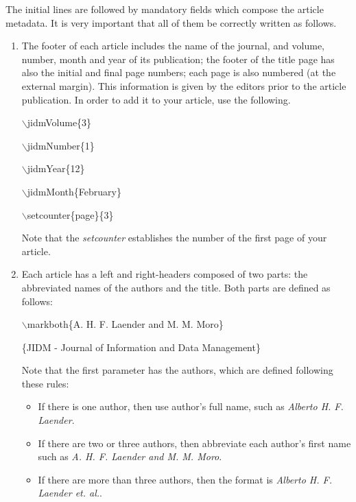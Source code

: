 \documentclass[jidm,a4paper]{jidm} %
\newenvironment{latexcode}
{\ttfamily\vspace{0.1in}\setlength{\parindent}{18pt}}
{\vspace{0.1in}}
\begin{document}

The initial lines are followed by mandatory fields which compose the article metadata. It is very important that all of them be correctly written as follows.

\begin{enumerate}
	\item The footer of each article includes the name of the journal, and volume, number, month and year of its publication; the footer of the title page has also the initial and final page numbers; each page is also numbered (at the external margin). This information is given by the editors prior to the article publication. In order to add it to your article, use the following.
	
		\begin{latexcode} 
			$\backslash$jidmVolume\{3\}
			
			$\backslash$jidmNumber\{1\}
			
			$\backslash$jidmYear\{12\}
			
			$\backslash$jidmMonth\{February\}
			
			$\backslash$setcounter\{page\}\{3\}
		\end{latexcode}

	Note that the \textit{setcounter} establishes the number of the first page of your article.

	\item Each article has a left and right-headers composed of two parts: the abbreviated names of the authors and the title. Both parts are defined as follows:
	
		\begin{latexcode} 
			$\backslash$markboth\{A. H. F. Laender and M. M. Moro\}
			
				\{JIDM - Journal of Information and Data Management\} 
		\end{latexcode}
	
		Note that the first parameter has the authors, which are defined following these rules:
		
\begin{itemize}
	\item If there is one author, then use author's full name, such as \textit{Alberto H. F. Laender}.
	\item If there are two or three authors, then abbreviate each author's first name such as \textit{A. H. F. Laender and M. M. Moro}.
	\item If there are more than three authors, then the format is \textit{Alberto H. F. Laender et. al.}.
\end{itemize}
	

\end{enumerate}
\end{document}

